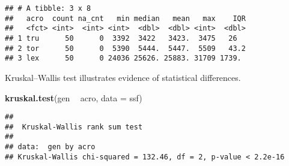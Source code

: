 \documentclass[]{book}
\newenvironment{Shaded}{\begin{snugshade}}{\end{snugshade}}
\newcommand{\DataTypeTok}[1]{\textcolor[rgb]{0.13,0.29,0.53}{#1}}
\newcommand{\KeywordTok}[1]{\textcolor[rgb]{0.13,0.29,0.53}{\textbf{#1}}}
\newcommand{\NormalTok}[1]{#1}
\newcommand{\OperatorTok}[1]{\textcolor[rgb]{0.81,0.36,0.00}{\textbf{#1}}}
\newcommand{\OtherTok}[1]{\textcolor[rgb]{0.56,0.35,0.01}{#1}}
\newcommand{\StringTok}[1]{\textcolor[rgb]{0.31,0.60,0.02}{#1}}
\begin{document}
\begin{Shaded}
\end{Shaded}

\begin{verbatim}
## # A tibble: 3 x 8
##   acro  count na_cnt   min median   mean   max    IQR
##   <fct> <int>  <int> <int>  <dbl>  <dbl> <int>  <dbl>
## 1 tru      50      0  3392  3422   3423.  3475   26  
## 2 tor      50      0  5390  5444.  5447.  5509   43.2
## 3 lex      50      0 24036 25626. 25883. 31709 1739.
\end{verbatim}

Kruskal--Wallis test illustrates evidence of statistical differences.

\begin{Shaded}
\begin{Highlighting}[]
\KeywordTok{kruskal.test}\NormalTok{(gen }\OperatorTok{~}\StringTok{ }\NormalTok{acro, }\DataTypeTok{data =}\NormalTok{ ssf)}
\end{Highlighting}
\end{Shaded}

\begin{verbatim}
## 
##  Kruskal-Wallis rank sum test
## 
## data:  gen by acro
## Kruskal-Wallis chi-squared = 132.46, df = 2, p-value < 2.2e-16
\end{verbatim}
\end{document}
